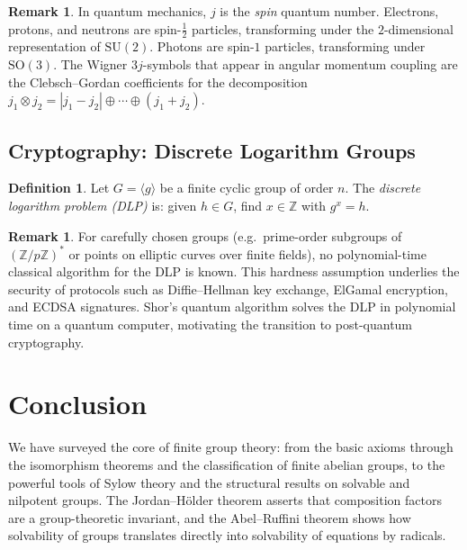 \documentclass[12pt,a4paper]{amsart}
\theoremstyle{definition}
\newtheorem{definition}[theorem]{Definition}
\newtheorem{remark}[theorem]{Remark}
\begin{document}
\begin{remark}
In quantum mechanics, $j$ is the \emph{spin} quantum number. Electrons, protons, and
neutrons are spin-$\frac{1}{2}$ particles, transforming under the $2$-dimensional
representation of $\mathrm{SU}(2)$. Photons are spin-$1$ particles, transforming under
$\mathrm{SO}(3)$. The Wigner $3j$-symbols that appear in angular momentum coupling are
the Clebsch--Gordan coefficients for the decomposition
$j_1 \otimes j_2 = |j_1 - j_2| \oplus \cdots \oplus (j_1 + j_2)$.
\end{remark}

\subsection{Cryptography: Discrete Logarithm Groups}

\begin{definition}
Let $G = \langle g \rangle$ be a finite cyclic group of order $n$. The
\emph{discrete logarithm problem (DLP)} is: given $h \in G$, find $x \in \mathbb{Z}$
with $g^x = h$.
\end{definition}

\begin{remark}
For carefully chosen groups (e.g.\ prime-order subgroups of $(\mathbb{Z}/p\mathbb{Z})^*$
or points on elliptic curves over finite fields), no polynomial-time classical algorithm
for the DLP is known. This hardness assumption underlies the security of protocols such
as Diffie--Hellman key exchange, ElGamal encryption, and ECDSA signatures. Shor's quantum
algorithm solves the DLP in polynomial time on a quantum computer, motivating the
transition to post-quantum cryptography.
\end{remark}

\section{Conclusion}
\label{sec:conclusion}

We have surveyed the core of finite group theory: from the basic axioms through the
isomorphism theorems and the classification of finite abelian groups, to the powerful
tools of Sylow theory and the structural results on solvable and nilpotent groups. The
Jordan--H\"{o}lder theorem asserts that composition factors are a group-theoretic
invariant, and the Abel--Ruffini theorem shows how solvability of groups translates
directly into solvability of equations by radicals.
\end{document}
